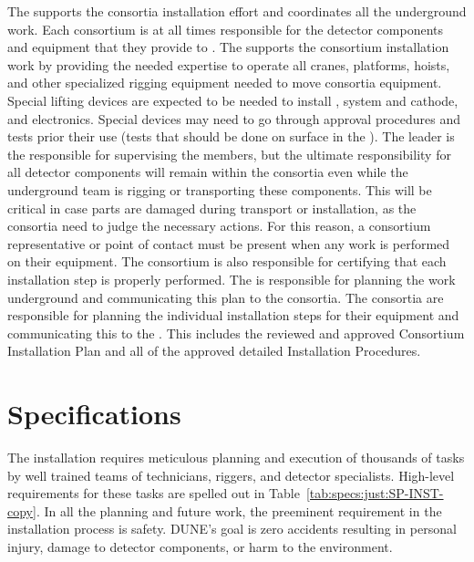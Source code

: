 The  supports the consortia installation effort and coordinates all the  underground work.
Each consortium is at all times responsible for the detector components and equipment that they provide to .
The  supports the consortium installation work by providing the needed expertise to operate all cranes, platforms, hoists, and other specialized rigging equipment needed to move consortia equipment.
Special lifting devices are expected to be needed to install ,  system  and cathode, and electronics.
Special devices may need to go through approval procedures and tests prior their use (tests that should be done on surface in the ).
The  leader is the responsible for supervising the  members, but the ultimate responsibility for all detector components will remain within the consortia even while the underground team is rigging or transporting these components.
This will be critical in case parts are damaged during transport or installation, as the consortia need to judge the necessary actions.
For this reason, a consortium representative or point of contact must be present when any work is performed on their equipment.
The consortium is also responsible for certifying that each installation step is properly performed.
The  is responsible for planning the work underground and communicating this plan to the consortia.
The consortia are responsible for planning the individual installation steps for their equipment and communicating this to the .
This includes the reviewed and approved Consortium Installation Plan and all of the approved detailed Installation Procedures.

\section{Specifications} 

The installation requires meticulous planning and execution of thousands of tasks by well trained
 teams of technicians, riggers, and detector specialists. High-level requirements for these tasks are spelled out in Table~\ref{tab:specs:just:SP-INST-copy}. In all the planning and future work, the preeminent requirement in the installation process is safety. DUNE’s goal is zero accidents resulting in personal injury, damage to detector components, or harm to the environment.











